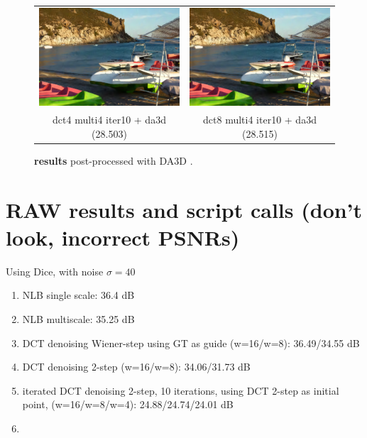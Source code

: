 \documentclass{ipol}
\begin{document}
\begin{figure}[htbp]
\begin{center}
\begin{tabular}{cc}
\includegraphics[width = .44\textwidth]{f/dct4_multi4_iter10_da3d}&
\includegraphics[width = .44\textwidth]{f/dct8_multi4_iter10_da3d}\\
dct4 multi4 iter10 + da3d (28.503) &  dct8 multi4 iter10  + da3d (28.515) \\

\end{tabular}
\caption{{\bf results} post-processed with DA3D \cite{Pierazzo2015}.}
\label{fig:da3d}
\end{center}
\end{figure}





\newpage

\section{RAW results and script calls (don't look, incorrect PSNRs)}

Using Dice, with noise $\sigma=40$

\begin{enumerate}
\item NLB single scale: 36.4 dB
\item NLB multiscale: 35.25 dB
\item DCT denoising Wiener-step using GT as guide (w=16/w=8): 36.49/34.55 dB
\item DCT denoising 2-step (w=16/w=8): 34.06/31.73 dB
\item iterated DCT denoising 2-step, 10 iterations, using DCT 2-step as initial point, (w=16/w=8/w=4): 24.88/24.74/24.01 dB
\item  

\end{enumerate}
\end{document}
